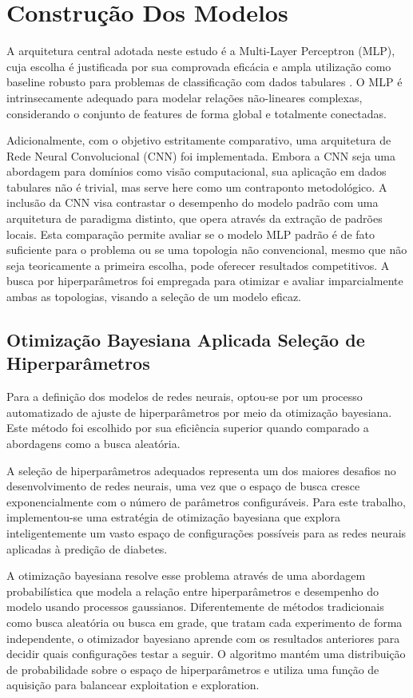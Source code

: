 \section{Construção Dos Modelos}
A arquitetura central adotada neste estudo é a Multi-Layer Perceptron (MLP), cuja escolha é justificada por sua comprovada eficácia e ampla utilização como baseline robusto para problemas de classificação com dados tabulares \cite{Goodfellow2016}. O MLP é intrinsecamente adequado para modelar relações não-lineares complexas, considerando o conjunto de features de forma global e totalmente conectadas.

Adicionalmente, com o objetivo estritamente comparativo, uma arquitetura de Rede Neural Convolucional (CNN) foi implementada. Embora a CNN seja uma abordagem para domínios como visão computacional, sua aplicação em dados tabulares não é trivial, mas serve here como um contraponto metodológico. A inclusão da CNN visa contrastar o desempenho do modelo padrão com uma arquitetura de paradigma distinto, que opera através da extração de padrões locais. Esta comparação permite avaliar se o modelo MLP padrão é de fato suficiente para o problema ou se uma topologia não convencional, mesmo que não seja teoricamente a primeira escolha, pode oferecer resultados competitivos. A busca por hiperparâmetros foi empregada para otimizar e avaliar imparcialmente ambas as topologias, visando a seleção de um modelo eficaz.

\subsection{Otimização Bayesiana Aplicada Seleção de Hiperparâmetros}
Para a definição dos modelos de redes neurais, optou-se por um processo automatizado de ajuste de hiperparâmetros por meio da otimização bayesiana. Este método foi escolhido por sua eficiência superior quando comparado a abordagens como a busca aleatória.

A seleção de hiperparâmetros adequados representa um dos maiores desafios no desenvolvimento de redes neurais, uma vez que o espaço de busca cresce exponencialmente com o número de parâmetros configuráveis. Para este trabalho, implementou-se uma estratégia de otimização bayesiana que explora inteligentemente um vasto espaço de configurações possíveis para as redes neurais aplicadas à predição de diabetes.

A otimização bayesiana resolve esse problema através de uma abordagem probabilística que modela a relação entre hiperparâmetros e desempenho do modelo usando processos gaussianos. Diferentemente de métodos tradicionais como busca aleatória ou busca em grade, que tratam cada experimento de forma independente, o otimizador bayesiano aprende com os resultados anteriores para decidir quais configurações testar a seguir. O algoritmo mantém uma distribuição de probabilidade sobre o espaço de hiperparâmetros e utiliza uma função de aquisição para balancear exploitation e exploration.

